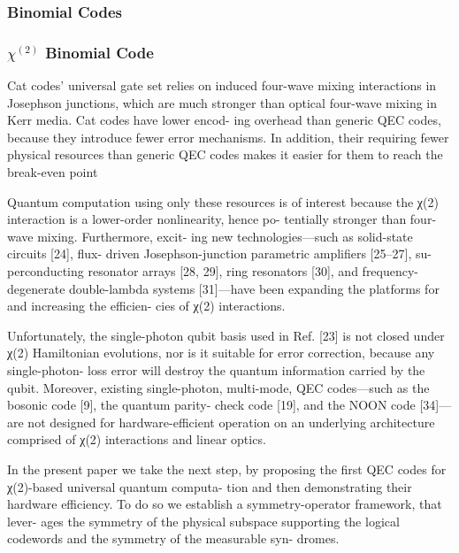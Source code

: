 \documentclass[12]{amsart}
\newcommand\0{\mathbf{0}}
\newcommand\<{\langle}
\renewcommand\>{\rangle}
\begin{document}
\subsubsection{Binomial Codes}
\label{sec:multi-binom}
\subsubsection*{$\chi^{(2)}$ Binomial Code}

Cat codes’ universal gate set relies on induced four-wave mixing interactions in Josephson junctions, which are much stronger than optical four-wave mixing in Kerr media. Cat codes have lower encod- ing overhead than generic QEC codes, because they introduce fewer error mechanisms. In addition, their requiring fewer physical resources than generic QEC codes makes it easier for them to reach the break-even point 

Quantum computation using only these resources is of interest because the χ(2) interaction is a lower-order nonlinearity, hence po- tentially stronger than four-wave mixing. Furthermore, excit- ing new technologies—such as solid-state circuits [24], flux- driven Josephson-junction parametric amplifiers [25–27], su- perconducting resonator arrays [28, 29], ring resonators [30], and frequency-degenerate double-lambda systems [31]—have been expanding the platforms for and increasing the efficien- cies of χ(2) interactions.

Unfortunately, the single-photon qubit basis used in Ref. [23] is not closed under χ(2) Hamiltonian evolutions, nor is it suitable for error correction, because any single-photon- loss error will destroy the quantum information carried by the qubit. Moreover, existing single-photon, multi-mode, QEC codes—such as the bosonic code [9], the quantum parity- check code [19], and the NOON code [34]—are not designed for hardware-efficient operation on an underlying architecture comprised of χ(2) interactions and linear optics.

In the present paper we take the next step, by proposing the first QEC codes for χ(2)-based universal quantum computa- tion and then demonstrating their hardware efficiency. To do so we establish a symmetry-operator framework, that lever- ages the symmetry of the physical subspace supporting the logical codewords and the symmetry of the measurable syn- dromes.
\end{document}
